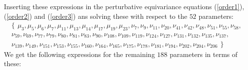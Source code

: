 \documentclass[a4paper,12pt, DIV=14, BCOR=5mm, twoside, headsepline]{scrbook}
\begin{document}
Inserting these expressions in the perturbative equivariance equations (\ref{order1}), (\ref{order2}) and (\ref{order3}) ans solving these with respect to the $52$ parameters:
\begin{multline}\label{AreaParas}
\bigl\{\,\  \mu_{{3}},\mu_{{5}},\mu_{{6}},\mu_{{7}},\mu_{{11}},\mu_{{13}}
,\mu_{{14}},\mu_{{17}},\mu_{{19}},\mu_{{23}},\nu_{{7}},\nu_{{9}},\nu_{
{11}},\nu_{{20}},\nu_{{41}},\nu_{{42}},\nu_{{48}},\nu_{{51}},\nu_{{55}
},\nu_{{58}},\\\nu_{{59}},\nu_{{69}},\nu_{{77}},\nu_{{79}},\nu_{{80}},
\nu_{{81}},\nu_{{83}},\nu_{{90}},\nu_{{108}},\nu_{{109}},\nu_{{119}},
\nu_{{124}},\nu_{{127}},\nu_{{131}},\nu_{{132}},\nu_{{135}},\nu_{{137}
},\\\nu_{{139}},\nu_{{149}},\nu_{{151}},\nu_{{153}},\nu_{{155}},\nu_{{
160}},\nu_{{164}},\nu_{{165}},\nu_{{175}},\nu_{{178}},\nu_{{181}},\nu_
{{194}},\nu_{{202}},\nu_{{204}},\nu_{{206}} \,\  \bigr\}
\end{multline}
We get the following expressions for the remaining $188$ parameters in terms of these:
\end{document}
